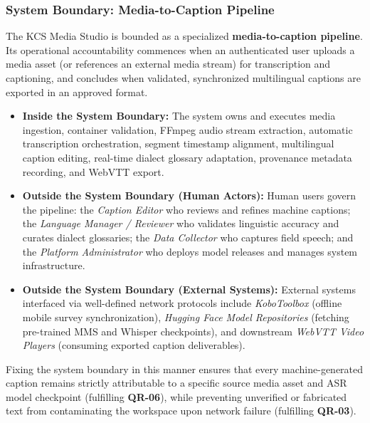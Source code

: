 \documentclass[a4paper,11pt]{article}
\begin{document}
\subsubsection{System Boundary: Media-to-Caption Pipeline}
\label{sec:chap3_arch_boundary}
The KCS Media Studio is bounded as a specialized \textbf{media-to-caption pipeline}. Its operational accountability commences when an authenticated user uploads a media asset (or references an external media stream) for transcription and captioning, and concludes when validated, synchronized multilingual captions are exported in an approved format. 
\begin{itemize}
    \item \textbf{Inside the System Boundary:} The system owns and executes media ingestion, container validation, FFmpeg audio stream extraction, automatic transcription orchestration, segment timestamp alignment, multilingual caption editing, real-time dialect glossary adaptation, provenance metadata recording, and WebVTT export.
    \item \textbf{Outside the System Boundary (Human Actors):} Human users govern the pipeline: the \textit{Caption Editor} who reviews and refines machine captions; the \textit{Language Manager / Reviewer} who validates linguistic accuracy and curates dialect glossaries; the \textit{Data Collector} who captures field speech; and the \textit{Platform Administrator} who deploys model releases and manages system infrastructure.
    \item \textbf{Outside the System Boundary (External Systems):} External systems interfaced via well-defined network protocols include \textit{KoboToolbox} (offline mobile survey synchronization), \textit{Hugging Face Model Repositories} (fetching pre-trained MMS and Whisper checkpoints), and downstream \textit{WebVTT Video Players} (consuming exported caption deliverables).
\end{itemize}
Fixing the system boundary in this manner ensures that every machine-generated caption remains strictly attributable to a specific source media asset and ASR model checkpoint (fulfilling \textbf{QR-06}), while preventing unverified or fabricated text from contaminating the workspace upon network failure (fulfilling \textbf{QR-03}).
\end{document}
